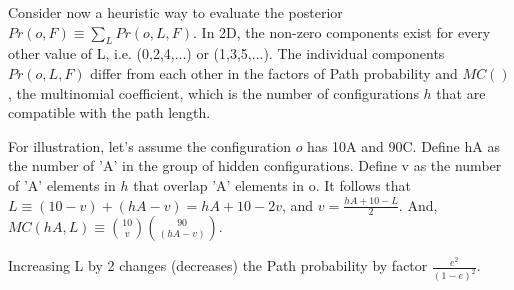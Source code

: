\documentclass{article}
\begin{document}
Consider now a heuristic way to evaluate the posterior $Pr(o,F) \equiv
\sum_L Pr(o,L,F)$. In 2D, the non-zero components exist for every
other value of L, i.e. (0,2,4,...) or (1,3,5,...). The individual
components $Pr(o,L,F)$ differ from each other in the factors of Path
probability and $MC()$, the multinomial coefficient, which is the number
of configurations $h$ that are compatible with the path
length.

For illustration, let's assume the configuration $o$ has 10A and 90C.
Define hA as the number of 'A' in the group of hidden configurations.
Define v as the number of 'A' elements in $h$ that overlap 'A'
elements in o.  It follows that $L \equiv (10-v) + (hA-v) = hA + 10 -
2v$, and $v = \frac{hA + 10 - L}{2}$.  And, $MC(hA,L) \equiv {10
  \choose v}{90 \choose (hA-v)}$.

Increasing L by 2 changes (decreases) the Path probability by factor
$\frac{e^2}{(1-e)^2}$.

\end{document}
